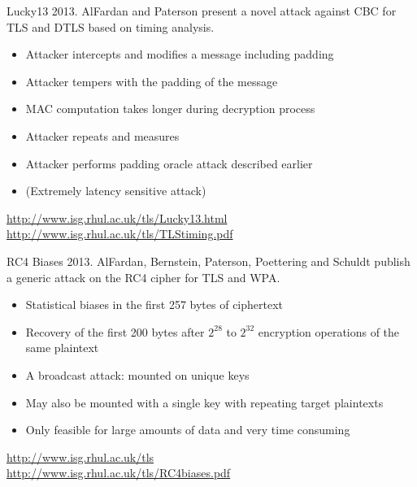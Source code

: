 \begin{frame}{Lucky13}
  2013. AlFardan and Paterson present a novel attack against CBC for TLS and DTLS based on timing analysis.
  \begin{itemize}
    \item Attacker intercepts and modifies a message including padding
    \item Attacker tempers with the padding of the message
    \item MAC computation takes longer during decryption process
    \item Attacker repeats and measures
    \item Attacker performs padding oracle attack described earlier
    \item (Extremely latency sensitive attack)
  \end{itemize}

  \vspace{50px}

  \tiny
  \url{http://www.isg.rhul.ac.uk/tls/Lucky13.html}\\
  \url{http://www.isg.rhul.ac.uk/tls/TLStiming.pdf}
\end{frame}

\begin{frame}{RC4 Biases}
  2013. AlFardan, Bernstein, Paterson, Poettering and Schuldt publish a generic attack on the RC4 cipher for TLS and WPA.
  \begin{itemize}
    \item Statistical biases in the first 257 bytes of ciphertext
    \item Recovery of the first 200 bytes after $2^{28}$ to $2^{32}$ encryption operations of the same plaintext
    \item A broadcast attack: mounted on unique keys
    \item May also be mounted with a single key with repeating target plaintexts
    \item Only feasible for large amounts of data and very time consuming
  \end{itemize}
  
  \vspace{20px}

  \tiny
  \url{http://www.isg.rhul.ac.uk/tls}\\
  \url{http://www.isg.rhul.ac.uk/tls/RC4biases.pdf}
\end{frame}

